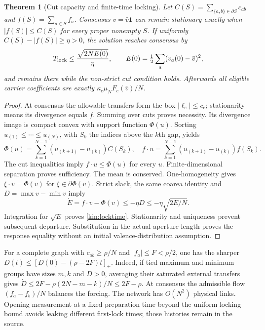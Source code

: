 \documentclass[11pt,oneside,openany]{book}
\newtheorem{theorem}{Theorem}[chapter]
\theoremstyle{definition}
\theoremstyle{remark}\newtheorem{remark}[theorem]{Remark}
\begin{document}
\begin{theorem}[Cut capacity and finite-time locking]\label{kin:locking}
Let $C(S)=\sum_{\{a,b\}\in\partial S}c_{ab}$ and
$f(S)=\sum_{a\in S}f_a$. Consensus $v=\bar v\mathbf1$ can remain
stationary exactly when $|f(S)|\le C(S)$ for every proper nonempty $S$.
If uniformly $C(S)-|f(S)|\ge\eta>0$, the solution reaches consensus by
\begin{equation}
 T_{\rm lock}\le\frac{\sqrt{2NE(0)}}{\eta},\qquad
 E(0)=\tfrac12\sum_a(v_a(0)-\bar v)^2,
 \label{kin:locktime}
\end{equation}
and remains there while the non-strict cut condition holds. Afterwards
all eligible carrier coefficients are exactly
$\kappa_e\mu_NF_e(\bar v)/N$.
\end{theorem}
\begin{proof}
At consensus the allowable transfers form the box $|\ell_e|\le c_e$;
stationarity means its divergence equals $f$. Summing over cuts proves
necessity. Its divergence image is compact convex with support function
$\Phi(u)$. Sorting $u_{(1)}\le\cdots\le u_{(N)}$, with $S_k$ the indices
above the $k$th gap, yields
\[
 \Phi(u)=\sum_{k=1}^{N-1}(u_{(k+1)}-u_{(k)})C(S_k),\quad
 f\cdot u=\sum_{k=1}^{N-1}(u_{(k+1)}-u_{(k)})f(S_k).
\]
The cut inequalities imply $f\cdot u\le\Phi(u)$ for every $u$.
Finite-dimensional separation proves sufficiency. The mean is conserved.
One-homogeneity gives $\xi\cdot v=\Phi(v)$ for
$\xi\in\partial\Phi(v)$. Strict slack, the same coarea identity and
$D=\max v-\min v$ imply
\[
 \dot E=f\cdot v-\Phi(v)\le-\eta D
 \le-\eta\sqrt{2E/N}.
\]
Integration for $\sqrt E$ proves \eqref{kin:locktime}. Stationarity and
uniqueness prevent subsequent departure. Substitution in the actual
aperture length proves the response equality without an initial
valence-distribution assumption.
\end{proof}

For a complete graph with $c_{ab}\ge\rho/N$ and $|f_a|\le F<\rho/2$,
one has the sharper $D(t)\le[D(0)-(\rho-2F)t]_+$. Indeed, if tied maximum
and minimum groups have sizes $m,k$ and $D>0$, averaging their saturated
external transfers gives
$\dot D\le2F-\rho(2N-m-k)/N\le2F-\rho$.
At consensus the admissible flow $(f_a-f_b)/N$ balances the forcing.
The network has $O(N^2)$ physical links. Opening measurement at a fixed
preparation time beyond the uniform locking bound avoids leaking different
first-lock times; those histories remain in the source.
\end{document}
